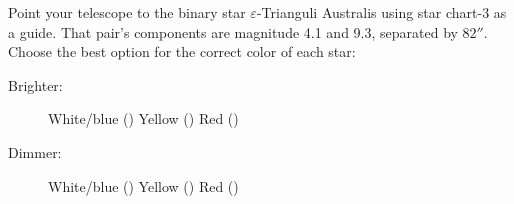 Point your telescope to the binary star $\varepsilon$-Trianguli Australis
using star chart-3 as a guide. That pair's components are magnitude 4.1 and
9.3, separated by $82''$. Choose the best option for the correct color of
each star:

\begin{description}
\item[Brighter:] White/blue (\quad) \qquad Yellow (\quad) \qquad
  Red (\quad)
\item[Dimmer:] White/blue (\quad) \qquad Yellow (\quad) \qquad
  Red (\quad)
\end{description}
